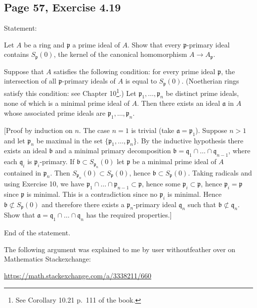 \documentclass[parskip=half,fontsize=12pt]{scrartcl}%
\begin{document}
\subsection{Page 57, Exercise 4.19}%

Statement:

Let $A$ be a ring and $\mathfrak p$ a prime ideal of $A$. Show that every $\mathfrak p$-primary ideal contains $S_{\mathfrak p}(0)$, the kernel of the canonical homomorphism $A\to A_{\mathfrak p}$.

Suppose that $A$ satisfies the following condition: for every prime ideal $\mathfrak p$, the intersection of all $\mathfrak p$-primary ideals of $A$ is equal to $S_{\mathfrak p}(0)$. (Noetherian rings satisfy this condition: see Chapter 10\footnote{See Corollary 10.21 p.~111 of the book.}.) Let $\mathfrak p_1,\dots,\mathfrak p_n$ be distinct prime ideals, none of which is a minimal prime ideal of $A$. Then there exists an ideal $\mathfrak a$ in $A$ whose associated prime ideals are $\mathfrak p_1,\dots,\mathfrak p_n$.

[Proof by induction on $n$. The case $n=1$ is trivial (take $\mathfrak a=\mathfrak p_1$). Suppose $n>1$ and let $\mathfrak p_n$ be maximal in the set $\{\mathfrak p_1,\dots,\mathfrak p_n\}$. By the inductive hypothesis there exists an ideal $\mathfrak b$ and a minimal primary decomposition $\mathfrak b=\mathfrak q_1\cap\dots\cap\mathfrak q_{n-1}$, where each $\mathfrak q_i$ is $\mathfrak p_i$-primary. If $\mathfrak b\subset S_{\mathfrak p_n}(0)$ let $\mathfrak p$ be a minimal prime ideal of $A$ contained in $\mathfrak p_n$. Then $S_{\mathfrak p_n}(0)\subset S_{\mathfrak p}(0)$, hence $\mathfrak b\subset S_{\mathfrak p}(0)$. Taking radicals and using Exercise 10, we have $\mathfrak p_1\cap\dots\cap\mathfrak p_{n-1}\subset\mathfrak p$, hence some $\mathfrak p_i\subset \mathfrak p$, hence $\mathfrak p_i=\mathfrak p$ since $\mathfrak p$ is minimal. This is a contradiction since no $\mathfrak p_i$ is minimal. Hence $\mathfrak b\not\subset S_{\mathfrak p}(0)$ and therefore there exists a $\mathfrak p_n$-primary ideal $\mathfrak q_n$ such that $\mathfrak b\not\subset\mathfrak q_n$. Show that $\mathfrak a=\mathfrak q_1\cap\dots\cap\mathfrak q_n$ has the required properties.]

End of the statement.

The following argument was explained to me by user withoutfeather over on Mathematics Stackexchange: 

\href{https://math.stackexchange.com/a/3338211/660}{https://math.stackexchange.com/a/3338211/660}
\end{document}
